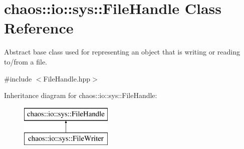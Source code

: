 \hypertarget{classchaos_1_1io_1_1sys_1_1_file_handle}{}\section{chaos\+:\+:io\+:\+:sys\+:\+:File\+Handle Class Reference}
\label{classchaos_1_1io_1_1sys_1_1_file_handle}


Abstract base class used for representing an object that is writing or reading to/from a file.  




{\ttfamily \#include $<$File\+Handle.\+hpp$>$}

Inheritance diagram for chaos\+:\+:io\+:\+:sys\+:\+:File\+Handle\+:\begin{figure}[H]
\begin{center}
\leavevmode
\includegraphics[height=2.000000cm]{classchaos_1_1io_1_1sys_1_1_file_handle}
\end{center}
\end{figure}
